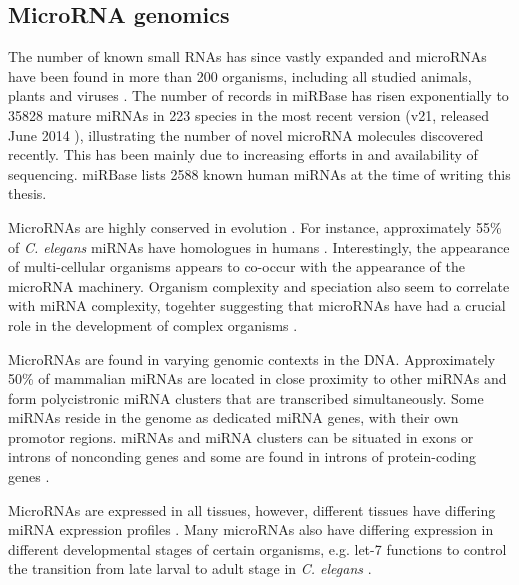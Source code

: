 \subsection{MicroRNA genomics}\label{microrna-genomics}

The number of known small RNAs has since vastly expanded and microRNAs have
been found in more than 200 organisms, including all studied animals, plants
\citep{JonesRhoades2006} and viruses \citep{Grundhoff2011}. The number of
records in miRBase has risen exponentially
to 35828 mature miRNAs in 223 species in the most recent
version (v21, released June 2014 \citep{MiRBaseWeb}), illustrating
the number of novel microRNA molecules discovered recently. This has been mainly due to
increasing efforts in and availability of sequencing. miRBase lists 2588 known
human miRNAs at the time of writing this thesis.

MicroRNAs are highly conserved in evolution \citep{Bartel2004}. For instance,
approximately 55\% of \emph{C. elegans} miRNAs have homologues in humans
\citep{IbanezVentoso2008}. Interestingly, the
appearance of multi-cellular organisms appears to co-occur with the appearance
of the microRNA machinery. Organism complexity and speciation also seem to
correlate with miRNA complexity, togehter suggesting that microRNAs have had a
crucial role in the development of complex organisms \citep{Lee2007}.

MicroRNAs are found in varying genomic contexts in the DNA. Approximately 50\% of
mammalian miRNAs are located in close proximity to other miRNAs and form
polycistronic miRNA clusters that are transcribed simultaneously. Some miRNAs
reside in the genome as dedicated miRNA genes, with their own promotor regions.
\citep{Kim2009} miRNAs and miRNA clusters can be situated in exons or
introns of nonconding genes and some are found in introns of protein-coding genes
\citep{Du2005}.

MicroRNAs are expressed in all tissues, however, different tissues have
differing miRNA expression profiles \citep{Krol2010}. Many microRNAs also have
differing expression in different developmental stages of certain organisms, e.g.
let-7 functions to control the transition from late larval to adult stage in
\emph{C. elegans} \citep{Bartel2004}.

